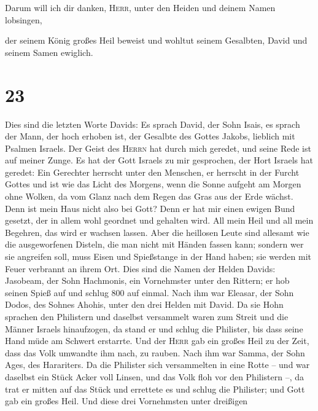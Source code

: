  Darum will ich dir danken, \textsc{Herr}, unter den
Heiden und deinem Namen lobsingen,

 der seinem König großes Heil beweist und wohltut seinem
Gesalbten, David und seinem Samen ewiglich.

\hypertarget{section-22}{%
\section{23}\label{section-22}}

 Dies sind die letzten Worte Davids: Es sprach David, der
Sohn Isais, es sprach der Mann, der hoch erhoben ist, der Gesalbte des
Gottes Jakobs, lieblich mit Psalmen Israels.  Der Geist
des \textsc{Herrn} hat durch mich geredet, und seine Rede ist auf meiner
Zunge.  Es hat der Gott Israels zu mir gesprochen, der
Hort Israels hat geredet: Ein Gerechter herrscht unter den Menschen, er
herrscht in der Furcht Gottes  und ist wie das Licht des
Morgens, wenn die Sonne aufgeht am Morgen ohne Wolken, da vom Glanz nach
dem Regen das Gras aus der Erde wächst.  Denn ist mein
Haus nicht also bei Gott? Denn er hat mir einen ewigen Bund gesetzt, der
in allem wohl geordnet und gehalten wird. All mein Heil und all mein
Begehren, das wird er wachsen lassen.  Aber die heillosen
Leute sind allesamt wie die ausgeworfenen Disteln, die man nicht mit
Händen fassen kann;  sondern wer sie angreifen soll, muss
Eisen und Spießstange in der Hand haben; sie werden mit Feuer verbrannt
an ihrem Ort.  Dies sind die Namen der Helden Davids:
Jasobeam, der Sohn Hachmonis, ein Vornehmster unter den Rittern; er hob
seinen Spieß auf und schlug 800 auf einmal.  Nach ihm war
Eleasar, der Sohn Dodos, des Sohnes Ahohis, unter den drei Helden mit
David. Da sie Hohn sprachen den Philistern und daselbst versammelt waren
zum Streit und die Männer Israels hinaufzogen,  da stand
er und schlug die Philister, bis dass seine Hand müde am Schwert
erstarrte. Und der \textsc{Herr} gab ein großes Heil zu der Zeit, dass
das Volk umwandte ihm nach, zu rauben.  Nach ihm war
Samma, der Sohn Ages, des Harariters. Da die Philister sich versammelten
in eine Rotte -- und war daselbst ein Stück Acker voll Linsen, und das
Volk floh vor den Philistern --,  da trat er mitten auf
das Stück und errettete es und schlug die Philister; und Gott gab ein
großes Heil.  Und diese drei Vornehmsten unter dreißigen

